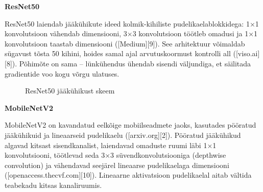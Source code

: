 \textbf{ResNet50}

ResNet50 laiendab jääkühikute ideed kolmik-kihiliste pudelikaelablokkidega: 1×1 konvolutsioon vähendab dimensiooni, 3×3 konvolutsioon töötleb omadusi ja 1×1 konvolutsioon taastab dimensiooni ([Medium][9]). See arhitektuur võimaldab sügavust tõsta 50 kihini, hoides samal ajal arvutuskoormust kontrolli all ([viso.ai][8]). Põhimõte on sama – lünkühendus ühendab sisendi väljundiga, et säilitada gradientide voo kogu võrgu ulatuses.

\begin{figure}[!ht]
    \centering
    \caption{ResNet50 jääkühikust skeem}
    \label{fig:ResNet50jääkühikust}
\end{figure}

\textbf{MobileNetV2}

MobileNetV2 on kavandatud eelkõige mobiilseadmete jaoks, kasutades pööratud jääkühikuid ja lineaarseid pudelikaelu ([arxiv.org][2]). Pööratud jääkühikud algavad kitsast sisendkanalist, laiendavad omaduste ruumi läbi 1×1 konvolutsiooni, töötlevad seda 3×3 süvendkonvolutsiooniga (depthwise convolution) ja vähendavad seejärel lineaarse pudelikaelaga dimensiooni ([openaccess.thecvf.com][10]). Lineaarne aktivatsioon pudelikaelal aitab vältida teabekadu kitsas kanaliruumis.

